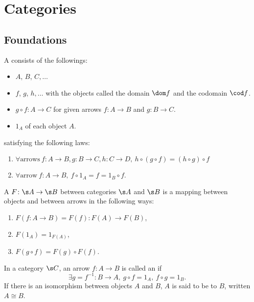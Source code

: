 \newcommand{\sets}{\mathbf{Sets}}
\newcommand{\op}[1]{{#1}^{\mathrm{op}}}
\newcommand{\arr}[1]{{#1}^{\rightarrow}}
\section{Categories}\cite{awodey}
\subsection{Foundations}
A  consists of the followings:
\begin{itemize}
\item {} $A$, $B$, $C, \dotsc$
\item {} $f$, $g$, $h, \dotsc$ with the objects called the domain $\dom f$ and the codomain $\cod f$.
\item {} $g \circ f \colon A \to C$ for given arrows $f \colon A \to B$ and $g \colon B \to C$.
\item {} $1_A$ of each object $A$.
\end{itemize}
satisfying the following laws:
\begin{enumerate}
\item $\forall \text{arrows}\ f \colon A \to B, g \colon B \to C, h \colon C \to D,\ h \circ (g \circ f) = (h \circ g) \circ f$
\item $\forall \text{arrow}\ f \colon A \to B,\ f \circ 1_A = f = 1_B \circ f$.
\end{enumerate}

A  $F\colon \s A \to \s B$ between categories $\s A$ and $\s B$ is a mapping between objects and between arrows in the following ways:
\begin{enumerate}
\item $F(f\colon A \to B) = F(f) \colon F(A) \to F(B)$,
\item $F(1_A) = 1_{F(A)}$,
\item $F(g \circ f) = F(g) \circ F(f)$.
\end{enumerate}

In a category $\s C$, an arrow $f \colon A \to B$ is called an  if
\[
\exists g = f^{-1} \colon B \to A,\ g \circ f = 1_A,\ f \circ g = 1_B.
\]
If there is an isomorphism between objects $A$ and $B$, $A$ is said to be  to $B$, written $A \cong B$.

